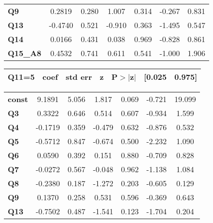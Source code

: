 \begin{center}
\begin{tabular}{lcccccc}
\textbf{Q9}      &       0.2819  &        0.280     &     1.007  &         0.314        &       -0.267    &        0.831     \\
\textbf{Q13}     &      -0.4740  &        0.521     &    -0.910  &         0.363        &       -1.495    &        0.547     \\
\textbf{Q14}     &       0.0166  &        0.431     &     0.038  &         0.969        &       -0.828    &        0.861     \\
\textbf{Q15\_A8} &       0.4532  &        0.741     &     0.611  &         0.541        &       -1.000    &        1.906     \\
\bottomrule
\end{tabular}
\begin{tabular}{ccccccc}
 \textbf{Q11=5}  & \textbf{coef} & \textbf{std err} & \textbf{z} & \textbf{P$> |$z$|$} & \textbf{[0.025} & \textbf{0.975]}  \\
\midrule
\bottomrule
\end{tabular}
\begin{tabular}{lcccccc}
\textbf{const}   &       9.1891  &        5.056     &     1.817  &         0.069        &       -0.721    &       19.099     \\
\textbf{Q3}      &       0.3322  &        0.646     &     0.514  &         0.607        &       -0.934    &        1.599     \\
\textbf{Q4}      &      -0.1719  &        0.359     &    -0.479  &         0.632        &       -0.876    &        0.532     \\
\textbf{Q5}      &      -0.5712  &        0.847     &    -0.674  &         0.500        &       -2.232    &        1.090     \\
\textbf{Q6}      &       0.0590  &        0.392     &     0.151  &         0.880        &       -0.709    &        0.828     \\
\textbf{Q7}      &      -0.0272  &        0.567     &    -0.048  &         0.962        &       -1.138    &        1.084     \\
\textbf{Q8}      &      -0.2380  &        0.187     &    -1.272  &         0.203        &       -0.605    &        0.129     \\
\textbf{Q9}      &       0.1370  &        0.258     &     0.531  &         0.596        &       -0.369    &        0.643     \\
\textbf{Q13}     &      -0.7502  &        0.487     &    -1.541  &         0.123        &       -1.704    &        0.204     \\

\end{tabular}
\end{center}
